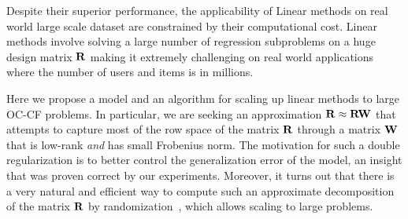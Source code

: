 

Despite their superior performance, the applicability of Linear methods on real world large scale dataset are constrained by their computational cost. Linear methods involve solving  a large number of regression subproblems on a huge design matrix $\mathbf{R}$ making it extremely challenging on real world applications where the number of users and items is in millions.

Here we propose a model and an algorithm for scaling up linear methods to large OC-CF problems.
In particular, we are seeking an approximation $\mathbf{R} \approx \mathbf{R} \mathbf{W}$ that attempts to capture most of the row space of the matrix $\mathbf{R}$ through a matrix $\mathbf{W}$ that is low-rank {\em and} has small Frobenius norm. The motivation for such a double regularization is to better control the generalization error of the model, an insight that was proven correct by our experiments. Moreover, it turns out that there is a very natural and efficient way to compute such an approximate decomposition of the matrix $\mathbf{R}$ by randomization~\citep{halko2011}, which allows scaling to large problems.

